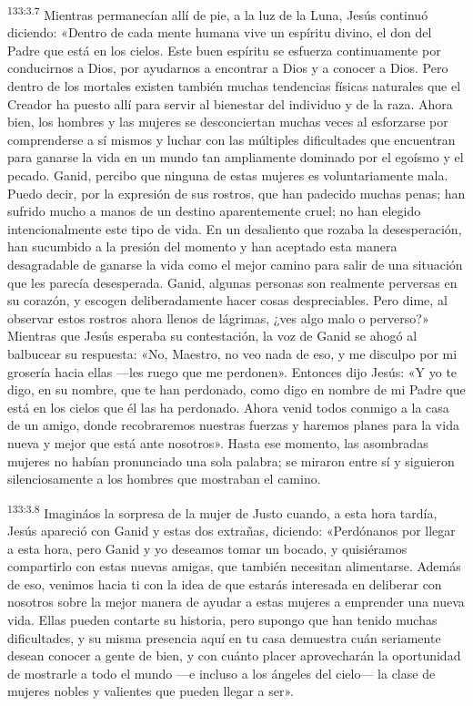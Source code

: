 \par 
\textsuperscript{133:3.7} Mientras permanecían allí de pie, a la luz de la Luna, Jesús continuó diciendo: «Dentro de cada mente humana vive un espíritu divino, el don del Padre que está en los cielos. Este buen espíritu se esfuerza continuamente por conducirnos a Dios, por ayudarnos a encontrar a Dios y a conocer a Dios. Pero dentro de los mortales existen también muchas tendencias físicas naturales que el Creador ha puesto allí para servir al bienestar del individuo y de la raza. Ahora bien, los hombres y las mujeres se desconciertan muchas veces al esforzarse por comprenderse a sí mismos y luchar con las múltiples dificultades que encuentran para ganarse la vida en un mundo tan ampliamente dominado por el egoísmo y el pecado. Ganid, percibo que ninguna de estas mujeres es voluntariamente mala. Puedo decir, por la expresión de sus rostros, que han padecido muchas penas; han sufrido mucho a manos de un destino aparentemente cruel; no han elegido intencionalmente este tipo de vida. En un desaliento que rozaba la desesperación, han sucumbido a la presión del momento y han aceptado esta manera desagradable de ganarse la vida como el mejor camino para salir de una situación que les parecía desesperada. Ganid, algunas personas son realmente perversas en su corazón, y escogen deliberadamente hacer cosas despreciables. Pero dime, al observar estos rostros ahora llenos de lágrimas, ¿ves algo malo o perverso?» Mientras que Jesús esperaba su contestación, la voz de Ganid se ahogó al balbucear su respuesta: «No, Maestro, no veo nada de eso, y me disculpo por mi grosería hacia ellas ---les ruego que me perdonen». Entonces dijo Jesús: «Y yo te digo, en su nombre, que te han perdonado, como digo en nombre de mi Padre que está en los cielos que él las ha perdonado. Ahora venid todos conmigo a la casa de un amigo, donde recobraremos nuestras fuerzas y haremos planes para la vida nueva y mejor que está ante nosotros». Hasta ese momento, las asombradas mujeres no habían pronunciado una sola palabra; se miraron entre sí y siguieron silenciosamente a los hombres que mostraban el camino.

\par 
\textsuperscript{133:3.8} Imagináos la sorpresa de la mujer de Justo cuando, a esta hora tardía, Jesús apareció con Ganid y estas dos extrañas, diciendo: «Perdónanos por llegar a esta hora, pero Ganid y yo deseamos tomar un bocado, y quisiéramos compartirlo con estas nuevas amigas, que también necesitan alimentarse. Además de eso, venimos hacia ti con la idea de que estarás interesada en deliberar con nosotros sobre la mejor manera de ayudar a estas mujeres a emprender una nueva vida. Ellas pueden contarte su historia, pero supongo que han tenido muchas dificultades, y su misma presencia aquí en tu casa demuestra cuán seriamente desean conocer a gente de bien, y con cuánto placer aprovecharán la oportunidad de mostrarle a todo el mundo ---e incluso a los ángeles del cielo--- la clase de mujeres nobles y valientes que pueden llegar a ser».

